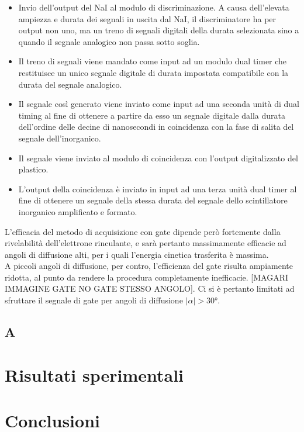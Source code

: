\documentclass[11pt]{article}
\begin{document}
\begin{itemize}
	\item Invio dell'output del NaI al modulo di discriminazione. A causa dell'elevata ampiezza e durata dei segnali in uscita dal NaI, il discriminatore ha per output non uno, ma un treno di segnali digitali della durata selezionata sino a quando il segnale analogico non passa sotto soglia.
	\item Il treno di segnali viene mandato come input ad un modulo dual timer che restituisce un unico segnale digitale di durata impostata compatibile con la durata del segnale analogico.
	\item Il segnale così generato viene inviato come input ad una seconda unità di dual timing al fine di ottenere a partire da esso un segnale digitale dalla durata dell'ordine delle decine di nanosecondi in coincidenza con la fase di salita del segnale dell'inorganico.
	\item Il segnale viene inviato al modulo di coincidenza con l'output digitalizzato del plastico.
	\item L'output della coincidenza è inviato in input ad una terza unità dual timer al fine di ottenere un segnale della stessa durata del segnale dello scintillatore inorganico amplificato e formato.
\end{itemize}

L'efficacia del metodo di acquisizione con gate dipende però fortemente dalla rivelabilità dell'elettrone rinculante, e sarà pertanto massimamente efficacie ad angoli di diffusione alti, per i quali l'energia cinetica trasferita è massima. \\
A piccoli angoli di diffusione, per contro, l'efficienza del gate risulta ampiamente ridotta, al punto da rendere la procedura completamente inefficacie. [MAGARI IMMAGINE GATE NO GATE STESSO ANGOLO]. Ci si è pertanto limitati ad sfruttare il segnale di gate per angoli di diffusione $|\alpha|>30°$. 

\subsection{A}

\section{Risultati sperimentali}


\section{Conclusioni}




\end{document}
